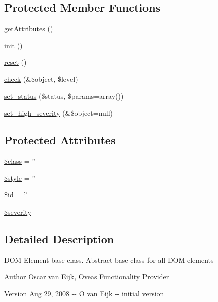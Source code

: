 \subsection*{Protected Member Functions}
\begin{DoxyCompactItemize}
\item 
\hyperlink{classDOMElement_a6c303bd7b18fdf485d05554b2f2191d9}{getAttributes} ()
\item 
\hyperlink{class__OWL_ae0ef3ded56e8a6b34b6461e5a721cd3e}{init} ()
\item 
\hyperlink{class__OWL_a2f2a042bcf31965194c03033df0edc9b}{reset} ()
\item 
\hyperlink{class__OWL_ad6f4f6946f40199dd0333cf219fa500e}{check} (\&\$object, \$level)
\item 
\hyperlink{class__OWL_aea912d0ede9b3c2a69b79072d94d4787}{set\_\-status} (\$status, \$params=array())
\item 
\hyperlink{class__OWL_a576829692a3b66e3d518853bf43abae3}{set\_\-high\_\-severity} (\&\$object=null)
\end{DoxyCompactItemize}
\subsection*{Protected Attributes}
\begin{DoxyCompactItemize}
\item 
\hyperlink{classDOMElement_a5114a8be2c698c735ec897857156d252}{\$class} = ''
\item 
\hyperlink{classDOMElement_aa678fb06bb8ffd915c7e6ded8cfc58b6}{\$style} = ''
\item 
\hyperlink{classDOMElement_a8b2176f3ade70abc7b41603618a992c0}{\$id} = ''
\item 
\hyperlink{class__OWL_ad26b40a9dbbacb33e299b17826f8327c}{\$severity}
\end{DoxyCompactItemize}


\subsection{Detailed Description}
DOM Element base class. Abstract base class for all DOM elements \begin{DoxyAuthor}{Author}
Oscar van Eijk, Oveas Functionality Provider 
\end{DoxyAuthor}
\begin{DoxyVersion}{Version}
Aug 29, 2008 -\/-\/ O van Eijk -\/-\/ initial version 
\end{DoxyVersion}


